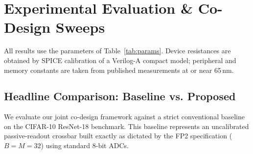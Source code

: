 \documentclass[conference]{IEEEtran}
\begin{document}
\section{Experimental Evaluation \& Co-Design Sweeps}
All results use the parameters of Table~\ref{tab:params}. Device resistances are obtained by SPICE calibration of a Verilog-A compact model; peripheral and memory constants are taken from published measurements at or near 65\,nm.

\begin{table}[H]
    \centering
    \caption{Simulation parameters.}
    \label{tab:params}
\end{table}

\subsection{Headline Comparison: Baseline vs. Proposed}
We evaluate our joint co-design framework against a strict conventional baseline on the CIFAR-10 ResNet-18 benchmark. This baseline represents an uncalibrated passive-readout crossbar built exactly as dictated by the FP2 specification ($B=M=32$) using standard 8-bit ADCs.
\end{document}
